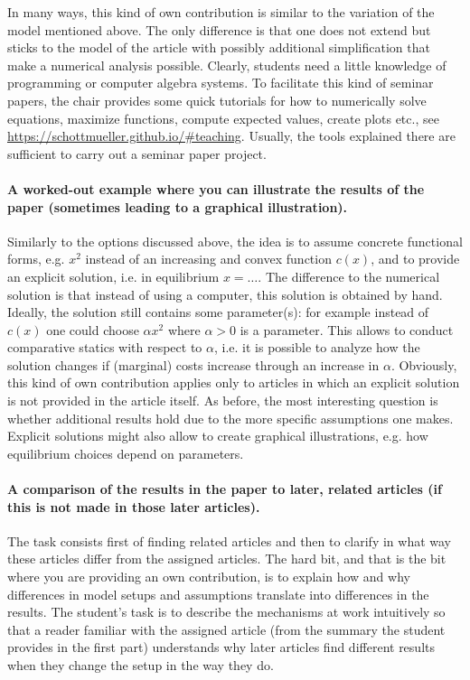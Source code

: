 \documentclass[a4paper,11pt]{article}
\begin{document}
In many ways, this kind of own contribution is similar to the variation of the model mentioned above. The only difference is that one does not extend but sticks to the model of the article with possibly additional simplification that make a numerical analysis possible. Clearly, students need a little knowledge of programming or computer algebra systems. To facilitate this kind of seminar papers, the chair provides some quick tutorials for how to numerically solve equations, maximize functions, compute expected values, create plots etc., see \url{https://schottmueller.github.io/#teaching}. Usually, the tools explained there are sufficient to carry out a seminar paper project. 

\paragraph{A worked-out example where you can illustrate the results of the paper (sometimes leading to a graphical illustration).} Similarly to the options discussed above, the idea is to assume concrete functional forms, e.g. $x^2$ instead of an increasing and convex function $c(x)$, and to provide an explicit solution, i.e. in equilibrium $x=\dots$. The difference to the numerical solution is that instead of using a computer, this solution is obtained by hand. Ideally, the solution still contains some parameter(s): for example instead of $c(x)$ one could choose $\alpha x^2$ where $\alpha>0$ is a parameter. This allows to conduct comparative statics with respect to $\alpha$, i.e. it is possible to analyze how the solution changes if (marginal) costs increase through an increase in $\alpha$. Obviously, this kind of own contribution applies only to articles in which an explicit solution is not provided in the article itself. As before, the most interesting question is whether additional results hold due to the more specific assumptions one makes. Explicit solutions might also allow to create graphical illustrations, e.g. how equilibrium choices depend on parameters.

\paragraph{A comparison of the results in the paper to later, related articles (if this is not made in those later articles).} The task consists first of finding related articles and then to clarify in what way these articles differ from the assigned articles. The hard bit, and that is the bit where you are providing an own contribution, is to explain how and why differences in model setups and assumptions translate into differences in the results. The student's task is to describe the mechanisms at work intuitively  so that a reader familiar with the assigned article (from the summary the student provides in the first part) understands why later articles find different results when they change the setup in the way they do.
\end{document}
